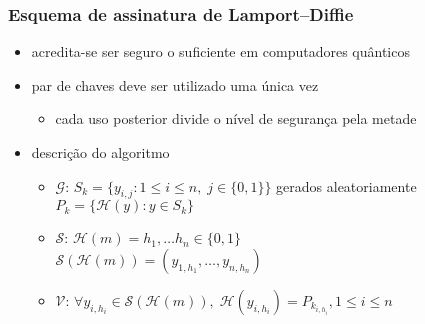 \documentclass{beamer}
\begin{document}
\begin{frame}
  \frametitle{Esquema de assinatura de Lamport--Diffie \cite{Lamport1979}}
  \begin{itemize}
    \item acredita-se ser seguro o suficiente em computadores quânticos
    \item par de chaves deve ser utilizado uma única vez
    \begin{itemize}
      \item cada uso posterior divide o nível de segurança pela metade
    \end{itemize}
    \item descrição do algoritmo
    \begin{itemize}
      \item $\mathcal{G}$: $S_{k} = \{y_{i, j} : 1 \leq i \leq n, \;
        j \in \{0, 1\}\}$ gerados aleatoriamente \\
        \hspace{1.3em}$P_{k} = \{\mathcal{H}(y) : y \in S_{k}\}$
    \item $\mathcal{S}$: $\mathcal{H}(m)
        = h_{1}, \dots h_{n} \in \{0, 1\}$ \\
        \hspace{1.3em}$\mathcal{S}(\mathcal{H}(m))
          = (y_{1, h_{1}}, \dots, y_{n, h_{n}})$
      \item $\mathcal{V}$:
          $\forall y_{i, h_{i}} \in \mathcal{S}(\mathcal{H}(m)), \;
            \mathcal{H}(y_{i, h_{i}}) = P_{k_{i, h_{i}}}, 1 \leq i \leq n$
    \end{itemize}
  \end{itemize}
\end{frame}
\end{document}
